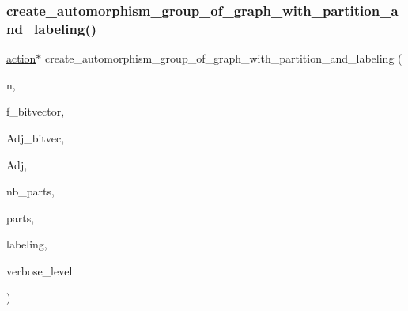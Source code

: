 \mbox{\label{action__global_8_c_a053822b1b3dac057bedfa4b69c842962}} 
\subsubsection{\texorpdfstring{create\+\_\+automorphism\+\_\+group\+\_\+of\+\_\+graph\+\_\+with\+\_\+partition\+\_\+and\+\_\+labeling()}{create\_automorphism\_group\_of\_graph\_with\_partition\_and\_labeling()}}
{\footnotesize\ttfamily \mbox{\hyperlink{classaction}{action}}$\ast$ create\+\_\+automorphism\+\_\+group\+\_\+of\+\_\+graph\+\_\+with\+\_\+partition\+\_\+and\+\_\+labeling (\begin{DoxyParamCaption}\item[{\mbox{\hyperlink{galois_8h_a09fddde158a3a20bd2dcadb609de11dc}{I\+NT}}}]{n,  }\item[{\mbox{\hyperlink{galois_8h_a09fddde158a3a20bd2dcadb609de11dc}{I\+NT}}}]{f\+\_\+bitvector,  }\item[{\mbox{\hyperlink{galois_8h_a122c4acf389c050379f00341fdcd5812}{U\+B\+Y\+TE}} $\ast$}]{Adj\+\_\+bitvec,  }\item[{\mbox{\hyperlink{galois_8h_a09fddde158a3a20bd2dcadb609de11dc}{I\+NT}} $\ast$}]{Adj,  }\item[{\mbox{\hyperlink{galois_8h_a09fddde158a3a20bd2dcadb609de11dc}{I\+NT}}}]{nb\+\_\+parts,  }\item[{\mbox{\hyperlink{galois_8h_a09fddde158a3a20bd2dcadb609de11dc}{I\+NT}} $\ast$}]{parts,  }\item[{\mbox{\hyperlink{galois_8h_a09fddde158a3a20bd2dcadb609de11dc}{I\+NT}} $\ast$}]{labeling,  }\item[{\mbox{\hyperlink{galois_8h_a09fddde158a3a20bd2dcadb609de11dc}{I\+NT}}}]{verbose\+\_\+level }\end{DoxyParamCaption})}

\mbox{\label{action__global_8_c_ad2cce64aa207f848e71c9fe51b41a9ff}} 
